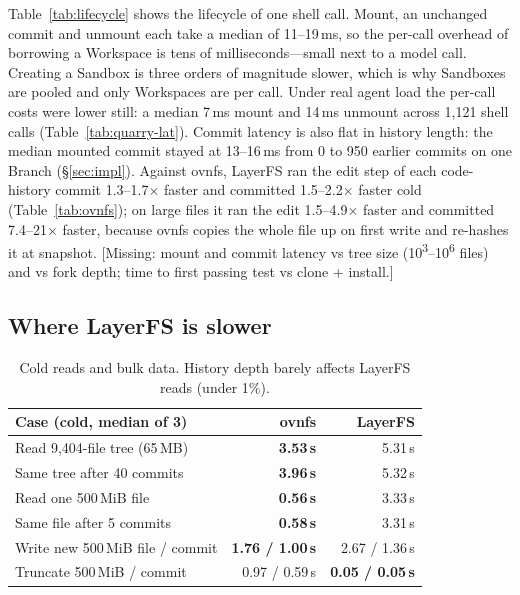 \documentclass[letterpaper,twocolumn,10pt]{article}
\newif\ifdraft\drafttrue
\newcommand{\dnote}[1]{\ifdraft\textcolor{red!70!black}{\textsf{\small[#1]}}\fi}
\newcommand{\sys}{LayerFS}
\newcommand{\ws}{Workspace}
\newcommand{\X}{$\times$}
\begin{document}
Table~\ref{tab:lifecycle} shows the lifecycle of one shell call. Mount,
an unchanged commit and unmount each take a median of 11--19\,ms, so the per-call
overhead of borrowing a \ws{} is tens of milliseconds---small next to a
model call. Creating a Sandbox is three orders of magnitude slower, which is
why Sandboxes are pooled and only \ws{}s are per call. Under real agent
load the per-call costs were lower still: a median 7\,ms mount and 14\,ms
unmount across 1,121 shell calls (Table~\ref{tab:quarry-lat}). Commit latency is
also flat in history length: the median mounted commit stayed at 13--16\,ms
from 0 to 950 earlier commits on one Branch (\S\ref{sec:impl}). Against
ovnfs, \sys{} ran the edit step of each code-history commit 1.3--1.7\X{}
faster and committed 1.5--2.2\X{} faster cold (Table~\ref{tab:ovnfs}); on
large files it ran the edit 1.5--4.9\X{} faster and committed 7.4--21\X{}
faster, because ovnfs copies the whole file up on first write and re-hashes
it at snapshot. \dnote{Missing: mount and commit latency vs tree size
(10\textsuperscript{3}--10\textsuperscript{6} files) and vs fork depth; time
to first passing test vs clone + install.}

\subsection{Where \sys{} is slower}
\label{sec:eval-slow}

\begin{table}[t]
\centering
\small
\setlength{\tabcolsep}{4pt}
\begin{tabular}{l r r}
\toprule
Case (cold, median of 3) & ovnfs & \sys{} \\
\midrule
Read 9,404-file tree (65\,MB)     & \textbf{3.53\,s} & 5.31\,s \\
Same tree after 40 commits        & \textbf{3.96\,s} & 5.32\,s \\
Read one 500\,MiB file            & \textbf{0.56\,s} & 3.33\,s \\
Same file after 5 commits         & \textbf{0.58\,s} & 3.31\,s \\
\midrule
Write new 500\,MiB file / commit  & \textbf{1.76 / 1.00\,s} & 2.67 / 1.36\,s \\
Truncate 500\,MiB / commit        & 0.97 / 0.59\,s & \textbf{0.05 / 0.05\,s} \\
\bottomrule
\end{tabular}
\caption{Cold reads and bulk data. History depth barely affects \sys{}
reads (under 1\%).}
\label{tab:slow}
\end{table}
\end{document}
